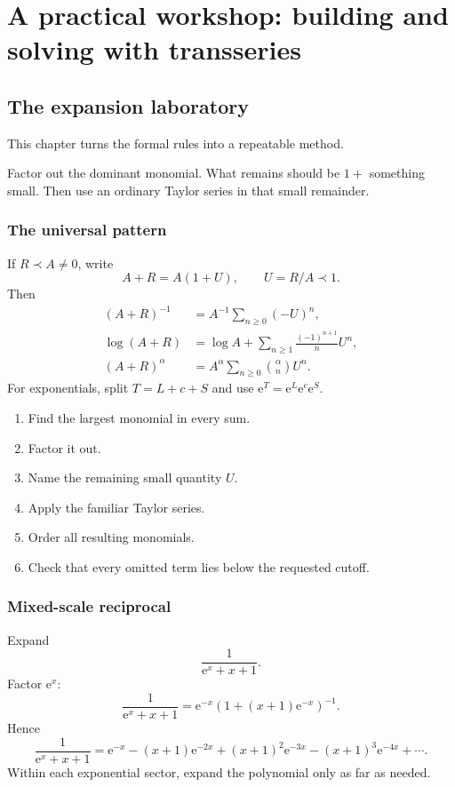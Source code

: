 \documentclass[11pt,oneside,openany]{book}
\newcommand{\e}{\mathrm{e}}
\theoremstyle{plain}
\theoremstyle{definition}
\theoremstyle{remark}
\begin{document}
\part{A practical workshop: building and solving with transseries}

\chapter{The expansion laboratory}
\label{ch:expansion-laboratory}

This chapter turns the formal rules into a repeatable method.

\begin{bigidea}
Factor out the dominant monomial. What remains should be $1+$ something small. Then use an ordinary Taylor series in that small remainder.
\end{bigidea}

\section{The universal pattern}
If $R\prec A\ne0$, write
\[
  A+R=A(1+U),
  \qquad U=R/A\prec1.
\]
Then
\begin{align*}
  (A+R)^{-1}&=A^{-1}\sum_{n\ge0}(-U)^n,\\
  \log(A+R)&=\log A+\sum_{n\ge1}\frac{(-1)^{n+1}}nU^n,\\
  (A+R)^\alpha&=A^\alpha\sum_{n\ge0}\binom\alpha nU^n.
\end{align*}
For exponentials, split $T=L+c+S$ and use $\e^T=\e^L\e^c\e^S$.

\begin{procedurebox}
\begin{enumerate}
  \item Find the largest monomial in every sum.
  \item Factor it out.
  \item Name the remaining small quantity $U$.
  \item Apply the familiar Taylor series.
  \item Order all resulting monomials.
  \item Check that every omitted term lies below the requested cutoff.
\end{enumerate}
\end{procedurebox}

\section{Mixed-scale reciprocal}
\begin{worked}
Expand
\[
  \frac1{\e^x+x+1}.
\]
Factor $\e^x$:
\[
  \frac1{\e^x+x+1}
  =\e^{-x}\left(1+(x+1)\e^{-x}\right)^{-1}.
\]
Hence
\[
\boxed{
  \frac1{\e^x+x+1}
  =\e^{-x}-(x+1)\e^{-2x}+(x+1)^2\e^{-3x}
  -(x+1)^3\e^{-4x}+\cdots.}
\]
Within each exponential sector, expand the polynomial only as far as needed.
\end{worked}
\end{document}
